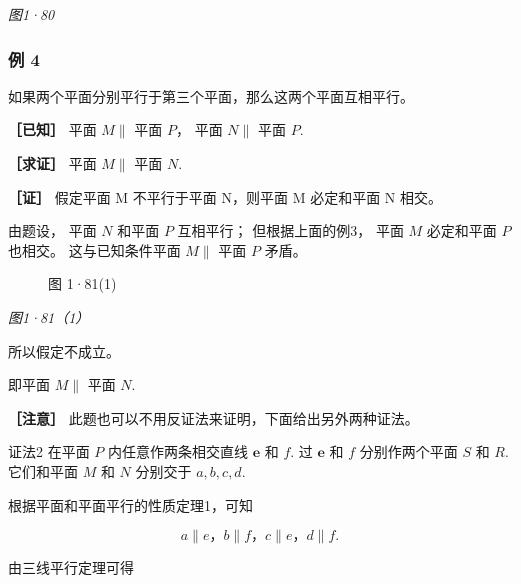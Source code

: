 \emph{图1·80}

\subsubsection{例 4}

如果两个平面分别平行于第三个平面，那么这两个平面互相平行。

\textbf{［已知］} 平面 \(M \parallel\) 平面 \(P\)， 平面 \(N \parallel\)
平面 \(P\).

\textbf{［求证］} 平面 \(M \parallel\) 平面 \(N\).

\textbf{［证］} 假定平面 M 不平行于平面 N，则平面 M 必定和平面 N 相交。

由题设， 平面 \(N\) 和平面 \(P\) 互相平行； 但根据上面的例3， 平面 \(M\)
必定和平面 \(P\) 也相交。 这与已知条件平面 \(M \parallel\) 平面 \(P\)
矛盾。

\begin{figure}
\centering
{}
\caption{图 1·81(1)}
\end{figure}

\emph{图1·81（1）}

所以假定不成立。

即平面 \(M \parallel\) 平面 \(N\).

\textbf{［注意］} 此题也可以不用反证法来证明，下面给出另外两种证法。

证法2 在平面 \(P\) 内任意作两条相交直线 \(\pmb{e}\) 和 \(f\). 过
\(\pmb{e}\) 和 \(f\) 分别作两个平面 \(S\) 和 \(R\). 它们和平面 \(M\) 和
\(N\) 分别交于 \(a, b, c, d\).

根据平面和平面平行的性质定理1，可知

\[
a \parallel e\text{，} b \parallel f\text{，} c \parallel e\text{，} d \parallel f.
\]

由三线平行定理可得

